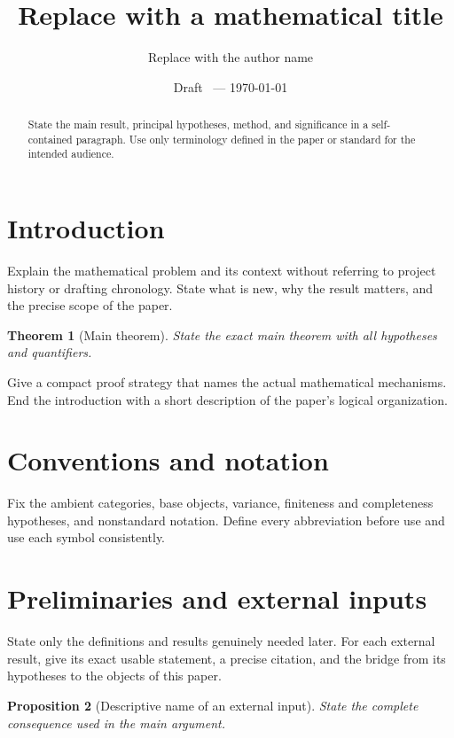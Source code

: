 \documentclass[11pt]{article}
\title{Replace with a mathematical title}
\author{Replace with the author name}
\date{Draft \paperversion\ --- \today}
\date{}
\newtheorem{theorem}{Theorem}[section]
\newtheorem{proposition}[theorem]{Proposition}
\theoremstyle{definition}
\begin{document}
\maketitle
\ifdraftpaper
  \linenumbers
\fi

\begin{abstract}
State the main result, principal hypotheses, method, and significance in a
self-contained paragraph. Use only terminology defined in the paper or
standard for the intended audience.
\end{abstract}

\section{Introduction}

Explain the mathematical problem and its context without referring to project
history or drafting chronology. State what is new, why the result matters, and
the precise scope of the paper.

\begin{theorem}[Main theorem]\label{thm:main}
State the exact main theorem with all hypotheses and quantifiers.
\end{theorem}

Give a compact proof strategy that names the actual mathematical mechanisms.
End the introduction with a short description of the paper's logical
organization.

\section{Conventions and notation}

Fix the ambient categories, base objects, variance, finiteness and completeness
hypotheses, and nonstandard notation. Define every abbreviation before use and
use each symbol consistently.

\section{Preliminaries and external inputs}

State only the definitions and results genuinely needed later. For each
external result, give its exact usable statement, a precise citation, and the
bridge from its hypotheses to the objects of this paper.

\begin{proposition}[Descriptive name of an external input]\label{prop:external}
State the complete consequence used in the main argument.
\end{proposition}
\end{document}
